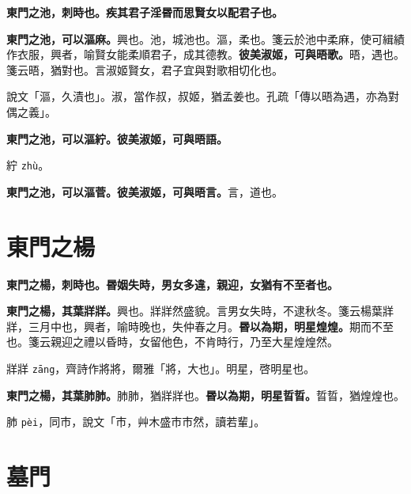 
\textbf{東門之池，刺時也。疾其君子淫昬而思賢女以配君子也。}

\textbf{東門之池，可以漚麻。}{\footnotesize 興也。池，城池也。漚，柔也。箋云於池中柔麻，使可緝績作衣服，興者，喻賢女能柔順君子，成其德教。}\textbf{彼美淑姬，可與晤歌。}{\footnotesize 晤，遇也。箋云晤，猶對也。言淑姬賢女，君子宜與對歌相切化也。}

\begin{quoting}說文「漚，久漬也」。淑，當作叔，叔姬，猶孟姜也。孔疏「傳以晤為遇，亦為對偶之義」。\end{quoting}

\textbf{東門之池，可以漚紵。彼美淑姬，可與晤語。}

\begin{quoting}紵 \texttt{zhù}。\end{quoting}

\textbf{東門之池，可以漚菅。彼美淑姬，可與晤言。}{\footnotesize 言，道也。}

\section{東門之楊}


\textbf{東門之楊，刺時也。昬姻失時，男女多違，親迎，女猶有不至者也。}

\textbf{東門之楊，其葉牂牂。}{\footnotesize 興也。牂牂然盛貌。言男女失時，不逮秋冬。箋云楊葉牂牂，三月中也，興者，喻時晚也，失仲春之月。}\textbf{昬以為期，明星煌煌。}{\footnotesize 期而不至也。箋云親迎之禮以昏時，女留他色，不肯時行，乃至大星煌煌然。}

\begin{quoting}牂牂 \texttt{zāng}，齊詩作將將，爾雅「將，大也」。明星，啓明星也。\end{quoting}

\textbf{東門之楊，其葉肺肺。}{\footnotesize 肺肺，猶牂牂也。}\textbf{昬以為期，明星晢晢。}{\footnotesize 晢晢，猶煌煌也。}

\begin{quoting}肺 \texttt{pèi}，同巿，說文「巿，艸木盛巿巿然，讀若輩」。\end{quoting}

\section{墓門}


